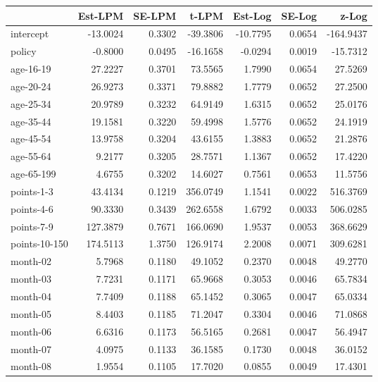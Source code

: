 \documentclass[10pt]{article}
\begin{document}
\begin{table}[ht]
\centering
\begin{tabular}{lrrrrrr}
  \hline
 & Est-LPM & SE-LPM & t-LPM & Est-Log & SE-Log & z-Log \\ 
  \hline
intercept & -13.0024 & 0.3302 & -39.3806 & -10.7795 & 0.0654 & -164.9437 \\ 
  policy & -0.8000 & 0.0495 & -16.1658 & -0.0294 & 0.0019 & -15.7312 \\ 
  age-16-19 & 27.2227 & 0.3701 & 73.5565 & 1.7990 & 0.0654 & 27.5269 \\ 
  age-20-24 & 26.9273 & 0.3371 & 79.8882 & 1.7779 & 0.0652 & 27.2500 \\ 
  age-25-34 & 20.9789 & 0.3232 & 64.9149 & 1.6315 & 0.0652 & 25.0176 \\ 
  age-35-44 & 19.1581 & 0.3220 & 59.4998 & 1.5776 & 0.0652 & 24.1919 \\ 
  age-45-54 & 13.9758 & 0.3204 & 43.6155 & 1.3883 & 0.0652 & 21.2876 \\ 
  age-55-64 & 9.2177 & 0.3205 & 28.7571 & 1.1367 & 0.0652 & 17.4220 \\ 
  age-65-199 & 4.6755 & 0.3202 & 14.6027 & 0.7561 & 0.0653 & 11.5756 \\ 
  points-1-3 & 43.4134 & 0.1219 & 356.0749 & 1.1541 & 0.0022 & 516.3769 \\ 
  points-4-6 & 90.3330 & 0.3439 & 262.6558 & 1.6792 & 0.0033 & 506.0285 \\ 
  points-7-9 & 127.3879 & 0.7671 & 166.0690 & 1.9537 & 0.0053 & 368.6629 \\ 
  points-10-150 & 174.5113 & 1.3750 & 126.9174 & 2.2008 & 0.0071 & 309.6281 \\ 
  month-02 & 5.7968 & 0.1180 & 49.1052 & 0.2370 & 0.0048 & 49.2770 \\ 
  month-03 & 7.7231 & 0.1171 & 65.9668 & 0.3053 & 0.0046 & 65.7834 \\ 
  month-04 & 7.7409 & 0.1188 & 65.1452 & 0.3065 & 0.0047 & 65.0334 \\ 
  month-05 & 8.4403 & 0.1185 & 71.2047 & 0.3304 & 0.0046 & 71.0868 \\ 
  month-06 & 6.6316 & 0.1173 & 56.5165 & 0.2681 & 0.0047 & 56.4947 \\ 
  month-07 & 4.0975 & 0.1133 & 36.1585 & 0.1730 & 0.0048 & 36.0152 \\ 
  month-08 & 1.9554 & 0.1105 & 17.7020 & 0.0855 & 0.0049 & 17.4301 \\ 

\end{tabular}
\end{table}
\end{document}
